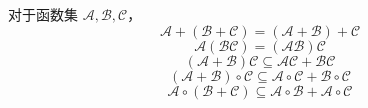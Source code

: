 \begin{theorem}
    对于函数集 $\mathcal{A},\mathcal{B},\mathcal{C}$，
    \[\mathcal{A} + (\mathcal{B} + \mathcal{C}) = (\mathcal{A} + \mathcal{B}) + \mathcal{C} \tag{1}\]
    \[\mathcal{A}(\mathcal{BC}) = (\mathcal{AB})\mathcal{C} \tag{2}\]
    \[(\mathcal{A} + \mathcal{B}) \mathcal{C} \subseteq \mathcal{AC} + \mathcal{BC} \tag{3}\]
    \[(\mathcal{A} + \mathcal{B}) \circ \mathcal{C} \subseteq \mathcal{A}\circ\mathcal{C} + \mathcal{B}\circ\mathcal{C} \tag{4}\]
    \[\mathcal{A}\circ(\mathcal{B} + \mathcal{C}) \subseteq \mathcal{A} \circ \mathcal{B} + \mathcal{A} \circ \mathcal{C} \tag{5}\]
\end{theorem}